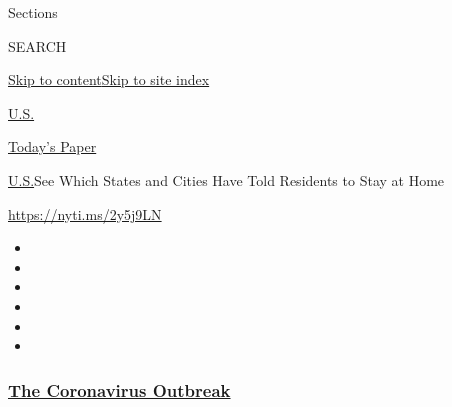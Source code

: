 Sections

SEARCH

\protect\hyperlink{site-content}{Skip to
content}\protect\hyperlink{site-index}{Skip to site index}

\href{https://www.nytimes3xbfgragh.onion/section/us}{U.S.}

\href{https://myaccount.nytimes3xbfgragh.onion/auth/login?response_type=cookie\&client_id=vi}{}

\href{https://www.nytimes3xbfgragh.onion/section/todayspaper}{Today's
Paper}

\href{/section/us}{U.S.}\textbar{}See Which States and Cities Have Told
Residents to Stay at Home

\url{https://nyti.ms/2y5j9LN}

\begin{itemize}
\item
\item
\item
\item
\item
\item
\end{itemize}

\hypertarget{the-coronavirus-outbreak}{%
\subsubsection{\texorpdfstring{\href{https://www.nytimes3xbfgragh.onion/news-event/coronavirus?name=styln-coronavirus-national\&region=TOP_BANNER\&block=storyline_menu_recirc\&action=click\&pgtype=Interactive\&impression_id=dadc2200-f2ba-11ea-841f-fb518d5e9681\&variant=undefined}{The
Coronavirus
Outbreak}}{The Coronavirus Outbreak}}\label{the-coronavirus-outbreak}}

